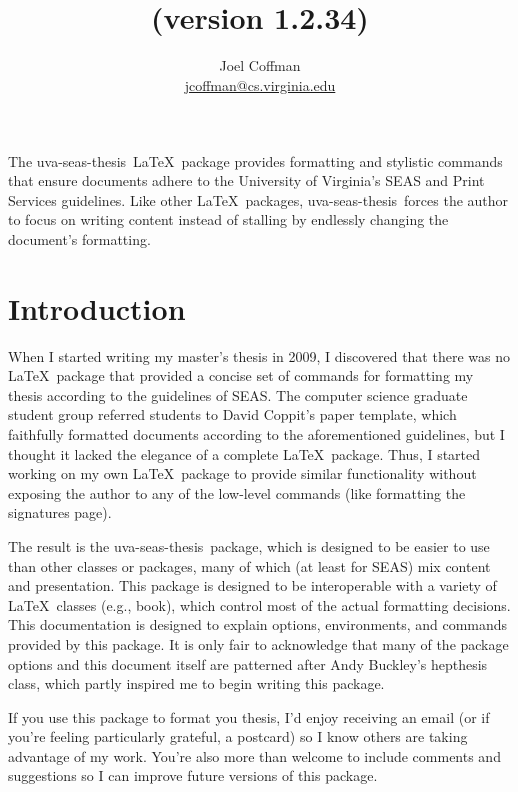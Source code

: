 \documentclass[10pt]{article}
\title{\thispackage\\{\normalsize (version 1.2.34)}}
\author{
  Joel Coffman\\
  \url{jcoffman@cs.virginia.edu}
}
\newcommand{\class}[1]{#1}
\newcommand{\package}[1]{#1}
\newcommand{\thispackage}{\package{uva-seas-thesis}}
\begin{document}
\maketitle

The \thispackage\ \LaTeX\ package provides formatting and stylistic commands that ensure documents adhere to the University of Virginia's \gls{SEAS} and Print Services guidelines.
Like other \LaTeX\ packages, \thispackage\ forces the author to focus on writing content instead of stalling by endlessly changing the document's formatting.

\section{Introduction}\label{section:introduction}
When I started writing my master's thesis in 2009, I discovered that there was no \LaTeX\ package that provided a concise set of commands for formatting my thesis according to the guidelines of \gls{SEAS}.
The computer science graduate student group referred students to David Coppit's paper template, which faithfully formatted documents according to the aforementioned guidelines, but I thought it lacked the elegance of a complete \LaTeX\ package.
Thus, I started working on my own \LaTeX\ package to provide similar functionality without exposing the author to any of the low-level commands (like formatting the signatures page).

The result is the \thispackage\ package, which is designed to be easier to use than other classes or packages, many of which (at least for \gls{SEAS}) mix content and presentation.
This package is designed to be interoperable with a variety of \LaTeX\ classes (e.g., \class{book}), which control most of the actual formatting decisions.
This documentation is designed to explain options, environments, and commands provided by this package.
It is only fair to acknowledge that many of the package options and this document itself are patterned after Andy Buckley's \class{hepthesis} class, which partly inspired me to begin writing this package.

If you use this package to format you thesis, I'd enjoy receiving an email (or if you're feeling particularly grateful, a postcard) so I know others are taking advantage of my work.
You're also more than welcome to include comments and suggestions so I can improve future versions of this package.

\end{document}
